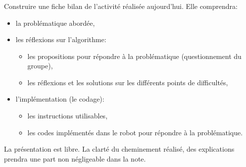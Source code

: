 \documentclass[svgnames,11pt]{beamer}
\begin{document}
\begin{frame}
    \frametitle{}

    \begin{center}
    \end{center}

\end{frame}
\begin{frame}
    \frametitle{}

    \begin{activite}
    Construire une fiche bilan de l'activité réalisée aujourd'hui. Elle comprendra:
    \begin{itemize}
        \item la problématique abordée,
        \item les réflexions sur l'algorithme:
        \begin{itemize}
            \item les propositions pour répondre à la problématique (questionnement du groupe),
            \item les réflexions et les solutions sur les différents points de difficultés,
        \end{itemize}
        \item l'implémentation (le codage):
        \begin{itemize}
            \item les instructions utilisables,
            \item les codes implémentés dans le robot pour répondre à la problématique.
        \end{itemize}
    \end{itemize}
    La présentation est libre. La clarté du cheminement réalisé, des explications prendra une part non négligeable dans la note.
    \end{activite}
\end{frame}
\end{document}
